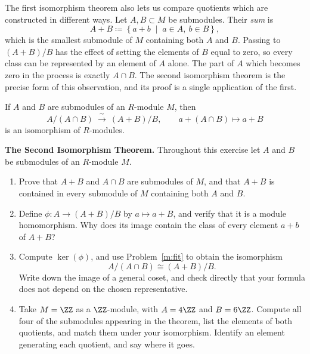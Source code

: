 \documentclass[12pt,reqno]{amsart}
\begin{document}
\hrulefill


The first isomorphism theorem also lets us compare quotients which are constructed in different ways. Let $A,B\subset M$ be submodules. Their \emph{sum} is
\[
 A+B\coloneqq\left\{a+b \;\; \big| \;\; a\in A,\ b\in B\right\},
\]
which is the smallest submodule of $M$ containing both $A$ and $B$. Passing to $(A+B)/B$ has the effect of setting the elements of $B$ equal to zero, so every class can be represented by an element of $A$ alone. The part of $A$ which becomes zero in the process is exactly $A\cap B$. The second isomorphism theorem is the precise form of this observation, and its proof is a single application of the first.

\begin{theorem}
If $A$ and $B$ are submodules of an $R$-module $M$, then
\[
 A/(A\cap B)\ \xrightarrow{\ \sim\ }\ (A+B)/B,
 \qquad a+(A\cap B)\longmapsto a+B
\]
is an isomorphism of $R$-modules.
\end{theorem}

\hrulefill

\begin{problems}
\item\label{m:second} \textbf{The Second Isomorphism Theorem.} Throughout this exercise let $A$ and $B$ be submodules of an $R$-module $M$.
\begin{enumerate}
\item Prove that $A+B$ and $A\cap B$ are submodules of $M$, and that $A+B$ is contained in every submodule of $M$ containing both $A$ and $B$.
\item Define $\phi:A\to(A+B)/B$ by $a\mapsto a+B$, and verify that it is a module homomorphism. Why does its image contain the class of every element $a+b$ of $A+B$?
\item Compute $\ker(\phi)$, and use Problem~\ref{m:fit} to obtain the isomorphism
\[
 A/(A\cap B)\cong(A+B)/B.
\]
Write down the image of a general coset, and check directly that your formula does not depend on the chosen representative.
\item Take $M=\ZZ$ as a $\ZZ$-module, with $A=4\ZZ$ and $B=6\ZZ$. Compute all four of the submodules appearing in the theorem, list the elements of both quotients, and match them under your isomorphism. Identify an element generating each quotient, and say where it goes.
\end{enumerate}
\end{problems}

\hrulefill
\end{document}
